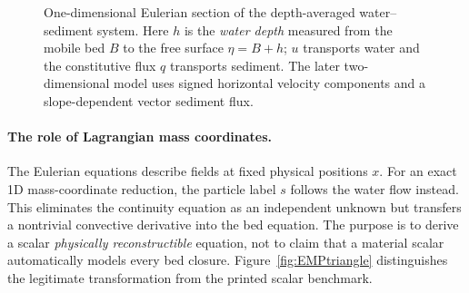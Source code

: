 \documentclass[12pt,a4paper,oneside]{report}
\numberwithin{equation}{chapter}
\theoremstyle{remark}\newtheorem{remark}[theorem]{Remark}
\begin{document}
\begin{figure}[htbp]\centering
{}
\caption[One-dimensional Eulerian water--sediment section]{One-dimensional Eulerian section of the depth-averaged
water--sediment system. Here $h$ is the \emph{water depth} measured from the
mobile bed $B$ to the free surface $\eta=B+h$; $u$ transports water and the
constitutive flux $q$ transports sediment. The later two-dimensional model
uses signed horizontal velocity components and a slope-dependent vector
sediment flux.}\label{fig:physical-1d}
\end{figure}

\paragraph{The role of Lagrangian mass coordinates.}
The Eulerian equations describe fields at fixed physical positions $x$.
For an exact 1D mass-coordinate reduction, the particle label $s$ follows
the water flow instead. This eliminates the continuity equation as an
independent unknown but transfers a nontrivial convective derivative into
the bed equation. The purpose is to derive a scalar \emph{physically
reconstructible} equation, not to claim that a material scalar automatically
models every bed closure. Figure~\ref{fig:EMPtriangle} distinguishes the
legitimate transformation from the printed scalar benchmark.
\end{document}
